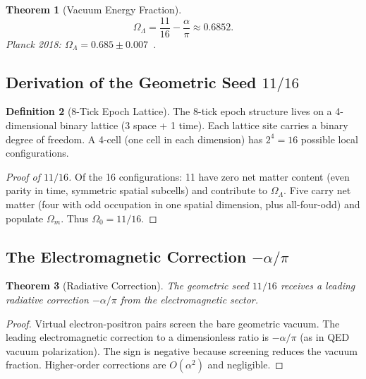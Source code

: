 \documentclass[12pt,a4paper]{article}
\newtheorem{theorem}{Theorem}[section]
\theoremstyle{definition}
\newtheorem{definition}[theorem]{Definition}
\theoremstyle{remark}
\begin{document}
\begin{theorem}[Vacuum Energy Fraction]
\label{thm:omegaLambda}
\begin{equation}
  \boxed{\Omega_\Lambda = \frac{11}{16} - \frac{\alpha}{\pi}
  \approx 0.6852.}
\end{equation}
Planck 2018: $\Omega_\Lambda = 0.685 \pm 0.007$~\cite{Planck2018}.
\end{theorem}

\subsection{Derivation of the Geometric Seed $11/16$}
\label{subsec:1116}

\begin{definition}[8-Tick Epoch Lattice]
The 8-tick epoch structure lives on a 4-dimensional binary lattice
(3 space + 1 time).  Each lattice site carries a binary degree of
freedom.  A 4-cell (one cell in each dimension) has $2^4 = 16$
possible local configurations.
\end{definition}

\begin{proof}[Proof of $11/16$]
Of the 16 configurations: 11 have zero net matter content (even parity
in time, symmetric spatial subcells) and contribute to $\Omega_\Lambda$.
Five carry net matter (four with odd occupation in one spatial
dimension, plus all-four-odd) and populate $\Omega_m$.  Thus
$\Omega_0 = 11/16$.
\end{proof}

\subsection{The Electromagnetic Correction $-\alpha/\pi$}
\label{subsec:alphaPi}

\begin{theorem}[Radiative Correction]
\label{thm:radcorr}
The geometric seed $11/16$ receives a leading radiative correction
$-\alpha/\pi$ from the electromagnetic sector.
\end{theorem}

\begin{proof}
Virtual electron-positron pairs screen the bare geometric vacuum.
The leading electromagnetic correction to a dimensionless ratio is
$-\alpha/\pi$ (as in QED vacuum polarization).  The sign is negative
because screening reduces the vacuum fraction.  Higher-order
corrections are $O(\alpha^2)$ and negligible.
\end{proof}
\end{document}
